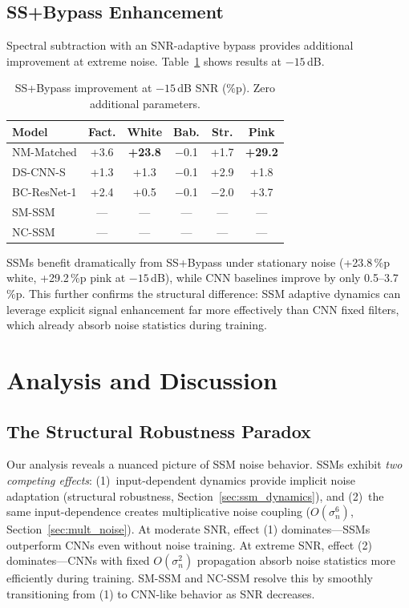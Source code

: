 \documentclass[journal]{IEEEtran}
\begin{document}
\subsection{SS+Bypass Enhancement}
\label{sec:ss_bypass}

Spectral subtraction with an SNR-adaptive bypass provides additional improvement at extreme noise. Table~\ref{tab:ss_bypass} shows results at $-15$\,dB.

\begin{table}[t]
\centering
\caption{SS+Bypass improvement at $-15$\,dB SNR (\%p). Zero additional parameters.}
\label{tab:ss_bypass}
\small
\begin{tabular}{lccccc}
\toprule
\textbf{Model} & \textbf{Fact.} & \textbf{White} & \textbf{Bab.} & \textbf{Str.} & \textbf{Pink} \\
\midrule
NM-Matched  & +3.6 & \textbf{+23.8} & $-$0.1 & +1.7 & \textbf{+29.2} \\
DS-CNN-S    & +1.3 & +1.3 & $-$0.1 & +2.9 & +1.8 \\
BC-ResNet-1 & +2.4 & +0.5 & $-$0.1 & $-$2.0 & +3.7 \\
SM-SSM      & --- & --- & --- & --- & --- \\
NC-SSM      & --- & --- & --- & --- & --- \\
\bottomrule
\end{tabular}
\end{table}

SSMs benefit dramatically from SS+Bypass under stationary noise (+23.8\,\%p white, +29.2\,\%p pink at $-15$\,dB), while CNN baselines improve by only 0.5--3.7\,\%p.
This further confirms the structural difference: SSM adaptive dynamics can leverage explicit signal enhancement far more effectively than CNN fixed filters, which already absorb noise statistics during training.


\section{Analysis and Discussion}
\label{sec:discussion}

\subsection{The Structural Robustness Paradox}

Our analysis reveals a nuanced picture of SSM noise behavior.
SSMs exhibit \emph{two competing effects}: (1)~input-dependent dynamics provide implicit noise adaptation (structural robustness, Section~\ref{sec:ssm_dynamics}), and (2)~the same input-dependence creates multiplicative noise coupling ($O(\sigma_n^6)$, Section~\ref{sec:mult_noise}).
At moderate SNR, effect (1) dominates---SSMs outperform CNNs even without noise training.
At extreme SNR, effect (2) dominates---CNNs with fixed $O(\sigma_n^2)$ propagation absorb noise statistics more efficiently during training.
SM-SSM and NC-SSM resolve this by smoothly transitioning from (1) to CNN-like behavior as SNR decreases.
\end{document}

